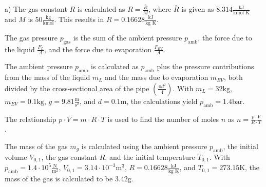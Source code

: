 a) The gas constant \( R \) is calculated as \( R = \frac{\bar{R}}{M} \), where \( \bar{R} \) is given as \( 8.314 \frac{\text{kJ}}{\text{kmol K}} \) and \( M \) is \( 50 \frac{\text{kg}}{\text{kmol}} \). This results in \( R = 0.16628 \frac{\text{kJ}}{\text{kg K}} \).

The gas pressure \( p_{\text{gas}} \) is the sum of the ambient pressure \( p_{\text{amb}} \), the force due to the liquid \( \frac{F_L}{A} \), and the force due to evaporation \( \frac{F_{EV}}{A} \).

The ambient pressure \( p_{\text{amb}} \) is calculated as \( p_{\text{amb}} \) plus the pressure contributions from the mass of the liquid \( m_L \) and the mass due to evaporation \( m_{EV} \), both divided by the cross-sectional area of the pipe \( \left(\frac{\pi d^2}{4}\right) \). With \( m_L = 32 \text{kg} \), \( m_{EV} = 0.1 \text{kg} \), \( g = 9.81 \frac{\text{m}}{\text{s}^2} \), and \( d = 0.1 \text{m} \), the calculations yield \( p_{\text{amb}} = 1.4 \text{bar} \).

The relationship \( p \cdot V = m \cdot R \cdot T \) is used to find the number of moles \( n \) as \( n = \frac{p \cdot V}{R \cdot T} \).

The mass of the gas \( m_g \) is calculated using the ambient pressure \( p_{\text{amb}} \), the initial volume \( V_{0,1} \), the gas constant \( R \), and the initial temperature \( T_{0,1} \). With \( p_{\text{amb}} = 1.4 \cdot 10^5 \frac{\text{N}}{\text{m}^2} \), \( V_{0,1} = 3.14 \cdot 10^{-3} \text{m}^3 \), \( R = 0.16628 \frac{\text{kJ}}{\text{kg K}} \), and \( T_{0,1} = 273.15 \text{K} \), the mass of the gas is calculated to be \( 3.42 \text{g} \).